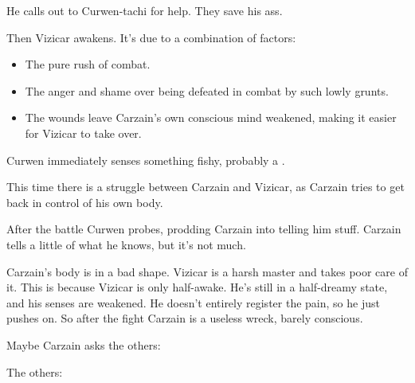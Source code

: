 \begin{garbage}
He calls out to Curwen-tachi for help. 
They save his ass. 

Then Vizicar awakens. 
It's due to a combination of factors: 

\begin{itemize}
  \item The pure rush of combat. 
  \item The anger and shame over being defeated in combat by such lowly grunts. 
  \item The wounds leave Carzain's own conscious mind weakened, making it easier for Vizicar to take over. 
\end{itemize}




Curwen immediately senses something fishy, probably a \vertexspike{}. 

This time there is a struggle between Carzain and Vizicar, as Carzain tries to get back in control of his own body. 


After the battle Curwen probes, prodding Carzain into telling him stuff. Carzain tells a little of what he knows, but it's not much. 

Carzain's body is in a bad shape. 
Vizicar is a harsh master and takes poor care of it. 
This is because Vizicar is only half-awake. 
He's still in a half-dreamy state, and his senses are weakened. 
He doesn't entirely register the pain, so he just pushes on. 
So after the fight Carzain is a useless wreck, barely conscious. 

Maybe Carzain asks the others:  

The others: 


\end{garbage}
